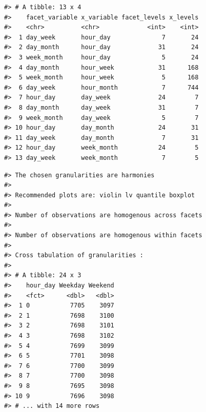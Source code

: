 \documentclass[12pt]{article}
\newenvironment{Shaded}{\begin{snugshade}}{\end{snugshade}}
\newcommand{\DataTypeTok}[1]{\textcolor[rgb]{0.13,0.29,0.53}{#1}}
\newcommand{\KeywordTok}[1]{\textcolor[rgb]{0.13,0.29,0.53}{\textbf{#1}}}
\newcommand{\NormalTok}[1]{#1}
\newcommand{\OperatorTok}[1]{\textcolor[rgb]{0.81,0.36,0.00}{\textbf{#1}}}
\newcommand{\StringTok}[1]{\textcolor[rgb]{0.31,0.60,0.02}{#1}}
\begin{document}
\begin{Shaded}
\end{Shaded}

\begin{verbatim}
#> # A tibble: 13 x 4
#>    facet_variable x_variable facet_levels x_levels
#>    <chr>          <chr>             <int>    <int>
#>  1 day_week       hour_day              7       24
#>  2 day_month      hour_day             31       24
#>  3 week_month     hour_day              5       24
#>  4 day_month      hour_week            31      168
#>  5 week_month     hour_week             5      168
#>  6 day_week       hour_month            7      744
#>  7 hour_day       day_week             24        7
#>  8 day_month      day_week             31        7
#>  9 week_month     day_week              5        7
#> 10 hour_day       day_month            24       31
#> 11 day_week       day_month             7       31
#> 12 hour_day       week_month           24        5
#> 13 day_week       week_month            7        5
\end{verbatim}

\begin{Shaded}
\end{Shaded}

\begin{verbatim}
#> The chosen granularities are harmonies 
#>  
#> Recommended plots are: violin lv quantile boxplot 
#>  
#> Number of observations are homogenous across facets 
#>  
#> Number of observations are homogenous within facets 
#>  
#> Cross tabulation of granularities : 
#>  
#> # A tibble: 24 x 3
#>    hour_day Weekday Weekend
#>    <fct>      <dbl>   <dbl>
#>  1 0           7705    3097
#>  2 1           7698    3100
#>  3 2           7698    3101
#>  4 3           7698    3102
#>  5 4           7699    3099
#>  6 5           7701    3098
#>  7 6           7700    3099
#>  8 7           7700    3098
#>  9 8           7695    3098
#> 10 9           7696    3098
#> # ... with 14 more rows
\end{verbatim}
\end{document}
